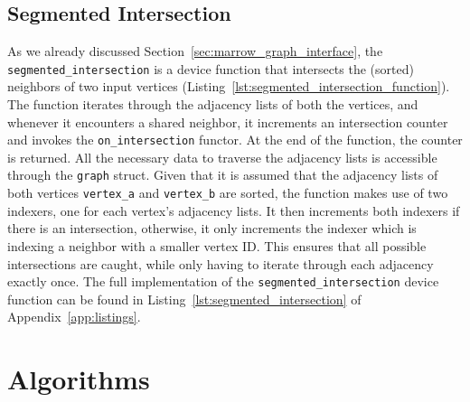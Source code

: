 \subsection{Segmented Intersection}
\label{sec:segmented_intersection}

As we already discussed Section~\ref{sec:marrow_graph_interface}, the \texttt{segmented\_intersection} is a device function that intersects the (sorted) neighbors of two input vertices (Listing~\ref{lst:segmented_intersection_function}). The function iterates through the adjacency lists of both the vertices, and whenever it encounters a shared neighbor, it increments an intersection counter and invokes the \texttt{on\_intersection} functor. At the end of the function, the counter is returned. All the necessary data to traverse the adjacency lists is accessible through the \texttt{graph} struct. Given that it is assumed that the adjacency lists of both vertices \texttt{vertex\_a} and \texttt{vertex\_b} are sorted, the function makes use of two indexers, one for each vertex's adjacency lists. It then increments both indexers if there is an intersection, otherwise, it only increments the indexer which is indexing a neighbor with a smaller vertex ID. This ensures that all possible intersections are caught, while only having to iterate through each adjacency exactly once. The full implementation of the \texttt{segmented\_intersection} device function can be found in Listing~\ref{lst:segmented_intersection} of Appendix~\ref{app:listings}.

%

\section{Algorithms}
\label{sec:marrow_graph_algorithms}

